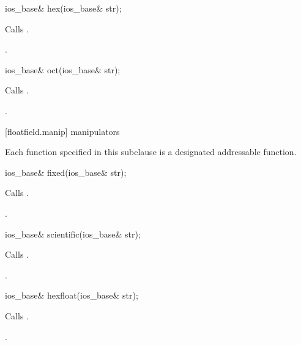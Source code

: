 %
\begin{itemdecl}
ios_base& hex(ios_base& str);
\end{itemdecl}

\begin{itemdescr}
\pnum
\effects
Calls
.

\pnum
\returns
{}.
\end{itemdescr}

%
\begin{itemdecl}
ios_base& oct(ios_base& str);
\end{itemdecl}

\begin{itemdescr}
\pnum
\effects
Calls
.

\pnum
\returns
{}.
\end{itemdescr}

[floatfield.manip]{ manipulators}

\pnum
Each function specified in this subclause
is a designated addressable function.

%
\begin{itemdecl}
ios_base& fixed(ios_base& str);
\end{itemdecl}

\begin{itemdescr}
\pnum
\effects
Calls
.

\pnum
\returns
{}.
\end{itemdescr}

%
\begin{itemdecl}
ios_base& scientific(ios_base& str);
\end{itemdecl}

\begin{itemdescr}
\pnum
\effects
Calls
.

\pnum
\returns
{}.
\end{itemdescr}

%
\begin{itemdecl}
ios_base& hexfloat(ios_base& str);
\end{itemdecl}

\begin{itemdescr}
\pnum\effects Calls .

\pnum\returns {}.
\end{itemdescr}

